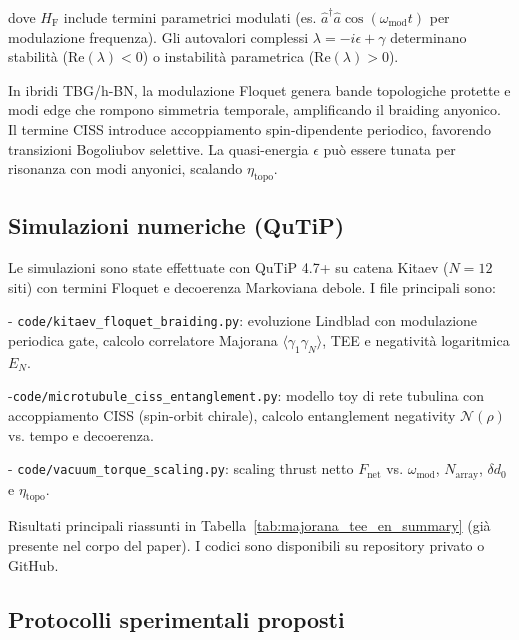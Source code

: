 \documentclass[11pt,a4paper]{article}
\let\oldref\ref
\renewcommand{\ref}{\protect\oldref}
\theoremstyle{plain}
\theoremstyle{definition}
\begin{document}
\begin{tcolorbox}
dove $H_{\mathrm{F}}$ include termini parametrici modulati (es. $\hat{a}^\dagger \hat{a} \cos(\omega_{\mathrm{mod}} t)$ per modulazione frequenza). Gli autovalori complessi $\lambda = -i \epsilon + \gamma$ determinano stabilità ($\mathrm{Re}(\lambda) < 0$) o instabilità parametrica ($\mathrm{Re}(\lambda) > 0$).

\vspace{0.4cm}

In ibridi TBG/h-BN, la modulazione Floquet genera bande topologiche protette e modi edge che rompono simmetria temporale, amplificando il braiding anyonico. Il termine CISS introduce accoppiamento spin-dipendente periodico, favorendo transizioni Bogoliubov selettive. La quasi-energia $\epsilon$ può essere tunata per risonanza con modi anyonici, scalando $\eta_{\mathrm{topo}}$.

\subsection{Simulazioni numeriche (QuTiP)}

Le simulazioni sono state effettuate con QuTiP 4.7+ su catena Kitaev ($N=12$ siti) con termini Floquet e decoerenza Markoviana debole. I file principali sono:

\vspace{1.0cm}

- \texttt{code/kitaev\_floquet\_braiding.py}: evoluzione Lindblad con modulazione periodica gate, calcolo correlatore Majorana $\langle \gamma_1 \gamma_N \rangle$, TEE e negatività logaritmica $E_N$.


\vspace{1cm}
-\texttt{code/microtubule\_ciss\_entanglement.py}: modello toy di rete tubulina con accoppiamento CISS (spin-orbit chirale), calcolo entanglement negativity $\mathcal{N}(\rho)$ vs. tempo e decoerenza.

\vspace{1cm}


- \texttt{code/vacuum\_torque\_scaling.py}: scaling thrust netto $F_{\mathrm{net}}$ vs. $\omega_{\mathrm{mod}}$, $N_{\mathrm{array}}$, $\delta d_0$ e $\eta_{\mathrm{topo}}$.

\vspace{0.5cm}

Risultati principali riassunti in Tabella~\ref{tab:majorana_tee_en_summary} (già presente nel corpo del paper). I codici sono disponibili su repository privato o GitHub.

\subsection{Protocolli sperimentali proposti}


\end{tcolorbox}
\end{document}
